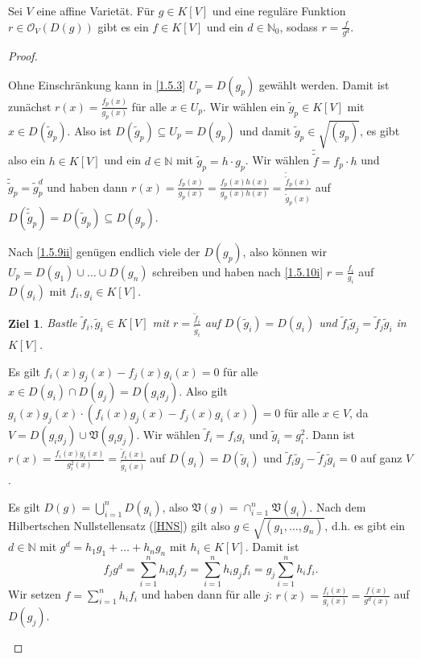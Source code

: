 \documentclass[a4paper,12pt]{scrbook}
\newtheorem{ziel}{Ziel}
\newtheorem{proof}{Beweis}
\def\V{\mathfrak{V}}
\def\O{\mathcal{O}}
\newcommand{\set}[1]{\ensuremath{\mathbb{#1}}}
\newcommand{\N}{\set{N}}
\begin{document}
\begin{prop}\label{1.5.10}
  Sei $V$ eine affine Varietät. Für $g\in K[V]$ und eine reguläre Funktion $r\in\O_V(D(g))$ gibt es ein $f\in K[V]$ und ein
  $d\in\N_0$, sodass $r=\frac{f}{g^d}$.
\end{prop}
\begin{proof}
  \begin{prooflist}
  \item{} Ohne Einschränkung kann in \cref{1.5.3} $U_p=D(g_p)$ gewählt werden. Damit ist zunächst
    $r(x)=\frac{f_p(x)}{g_p(x)}$ für alle $x\in U_p$. Wir wählen ein $\tilde{g}_p\in K[V]$ mit $x\in D(\tilde{g}_p)$. Also ist
    $D(\tilde{g}_p)\subseteq U_p=D(g_p)$ und damit $\tilde{g}_p\in\sqrt{(g_p)}$, es gibt also ein $h\in K[V]$ und ein $d\in\N$
    mit $\tilde{g}_p=h\cdot g_p$. Wir wählen $\tilde{\tilde{f}}=f_p\cdot h$ und $\tilde{\tilde{g}}_p=\tilde{g}_p^d$ und haben
    dann $r(x)=\frac{f_p(x)}{g_p(x)} = \frac{f_p(x)h(x)}{g_p(x)h(x)} = \frac{\tilde{\tilde{f}}_p(x)}{\tilde{\tilde{g}}_p(x)}$
    auf $D(\tilde{\tilde{g}}_p)=D(\tilde{g}_p)\subseteq D(g_p)$.
  \item Nach \cref{1.5.9ii} genügen endlich viele der $D(g_p)$, also können wir $U_p=D(g_1)\cup\dotso\cup
    D(g_n)$ schreiben und haben nach \ref{1.5.10i} $r=\frac{f_i}{g_i}$ auf $D(g_i)$ mit $f_i,g_i\in K[V]$.
    \begin{ziel}
      Bastle $\tilde{f}_i,\tilde{g}_i\in K[V]$ mit $r=\frac{\tilde{f}_i}{\tilde{g}_i}$ auf $D(\tilde{g}_i)=D(g_i)$ und
      $\tilde{f}_i\tilde{g}_j=\tilde{f}_j\tilde{g}_i$ in $K[V]$.
    \end{ziel}
    Es gilt $f_i(x)g_j(x)-f_j(x)g_i(x)=0$ für alle $x\in D(g_i)\cap D(g_j)=D(g_ig_j)$. Also gilt
    $g_i(x)g_j(x)\cdot(f_i(x)g_j(x)-f_j(x)g_i(x))=0$ für alle $x\in V$, da $V=D(g_ig_j)\cup\V(g_ig_j)$. Wir wählen
    $\tilde{f}_i=f_ig_i$ und $\tilde{g}_i=g_i^2$. Dann ist $r(x)=\frac{f_i(x)g_i(x)}{g_i^2(x)} =
    \frac{\tilde{f}_i(x)}{\tilde{g}_i(x)}$ auf $D(g_i)=D(\tilde{g}_i)$ und $\tilde{f}_i\tilde{g}_j-\tilde{f}_j\tilde{g}_i=0$ auf
    ganz $V$.

    Es gilt $D(g)=\bigcup_{i=1}^n D(g_i)$, also $\V(g)=\cap_{i=1}^n\V(g_i)$. Nach dem Hilbertschen Nullstellensatz
    (\cref{HNS}) gilt also $g\in\sqrt{(g_1,\dotsc,g_n)}$, d.h. es gibt ein $d\in\N$ mit $g^d=h_1g_1+\dotso+h_ng_n$ mit
    $h_i\in K[V]$. Damit ist
    \[ f_jg^d = \sum_{i=1}^nh_ig_if_j = \sum_{i=1}^n h_ig_jf_i = g_j\sum_{i=1}^nh_if_i. \]
    Wir setzen $f=\displaystyle\sum_{i=1}^nh_if_i$ und haben dann für alle $j$: $r(x)=\frac{f_i(x)}{g_i(x)}=\frac{f(x)}{g^d(x)}$
    auf $D(g_j)$.
  \end{prooflist}
\end{proof}
\end{document}

